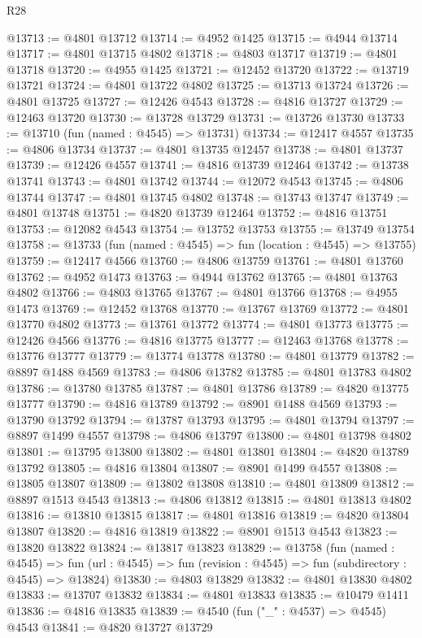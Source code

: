 \begin{lexlean}{R28}
\begin{coremodule}
@13713 := @4801 @13712
@13714 := @4952 @1425
@13715 := @4944 @13714
@13717 := @4801 @13715 @4802
@13718 := @4803 @13717
@13719 := @4801 @13718
@13720 := @4955 @1425
@13721 := @12452 @13720
@13722 := @13719 @13721
@13724 := @4801 @13722 @4802
@13725 := @13713 @13724
@13726 := @4801 @13725
@13727 := @12426 @4543
@13728 := @4816 @13727
@13729 := @12463 @13720
@13730 := @13728 @13729
@13731 := @13726 @13730
@13733 := @13710 (fun (named : @4545) => @13731)
@13734 := @12417 @4557
@13735 := @4806 @13734
@13737 := @4801 @13735 @12457
@13738 := @4801 @13737
@13739 := @12426 @4557
@13741 := @4816 @13739 @12464
@13742 := @13738 @13741
@13743 := @4801 @13742
@13744 := @12072 @4543
@13745 := @4806 @13744
@13747 := @4801 @13745 @4802
@13748 := @13743 @13747
@13749 := @4801 @13748
@13751 := @4820 @13739 @12464
@13752 := @4816 @13751
@13753 := @12082 @4543
@13754 := @13752 @13753
@13755 := @13749 @13754
@13758 := @13733 (fun (named : @4545) => fun (location : @4545) => @13755)
@13759 := @12417 @4566
@13760 := @4806 @13759
@13761 := @4801 @13760
@13762 := @4952 @1473
@13763 := @4944 @13762
@13765 := @4801 @13763 @4802
@13766 := @4803 @13765
@13767 := @4801 @13766
@13768 := @4955 @1473
@13769 := @12452 @13768
@13770 := @13767 @13769
@13772 := @4801 @13770 @4802
@13773 := @13761 @13772
@13774 := @4801 @13773
@13775 := @12426 @4566
@13776 := @4816 @13775
@13777 := @12463 @13768
@13778 := @13776 @13777
@13779 := @13774 @13778
@13780 := @4801 @13779
@13782 := @8897 @1488 @4569
@13783 := @4806 @13782
@13785 := @4801 @13783 @4802
@13786 := @13780 @13785
@13787 := @4801 @13786
@13789 := @4820 @13775 @13777
@13790 := @4816 @13789
@13792 := @8901 @1488 @4569
@13793 := @13790 @13792
@13794 := @13787 @13793
@13795 := @4801 @13794
@13797 := @8897 @1499 @4557
@13798 := @4806 @13797
@13800 := @4801 @13798 @4802
@13801 := @13795 @13800
@13802 := @4801 @13801
@13804 := @4820 @13789 @13792
@13805 := @4816 @13804
@13807 := @8901 @1499 @4557
@13808 := @13805 @13807
@13809 := @13802 @13808
@13810 := @4801 @13809
@13812 := @8897 @1513 @4543
@13813 := @4806 @13812
@13815 := @4801 @13813 @4802
@13816 := @13810 @13815
@13817 := @4801 @13816
@13819 := @4820 @13804 @13807
@13820 := @4816 @13819
@13822 := @8901 @1513 @4543
@13823 := @13820 @13822
@13824 := @13817 @13823
@13829 := @13758
    (fun (named : @4545) =>
    fun (url : @4545) => fun (revision : @4545) => fun (subdirectory : @4545) => @13824)
@13830 := @4803 @13829
@13832 := @4801 @13830 @4802
@13833 := @13707 @13832
@13834 := @4801 @13833
@13835 := @10479 @1411
@13836 := @4816 @13835
@13839 := @4540 (fun ("_" : @4537) => @4545) @4543
@13841 := @4820 @13727 @13729

\end{coremodule}
\end{lexlean}
